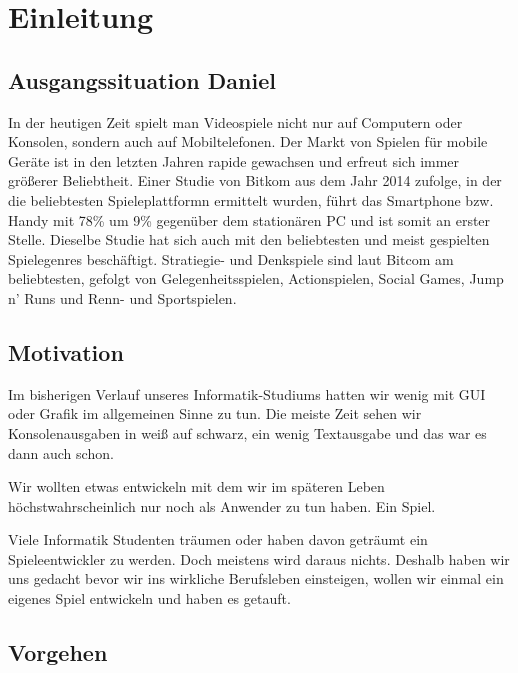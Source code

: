 \chapter{Einleitung}\label{ch:intro}

\section[Ausgangssituation]{Ausgangssituation \tiny{Daniel}}\label{sec:1_Ausgangssituation}

In der heutigen Zeit spielt man Videospiele nicht nur auf Computern oder Konsolen, sondern auch auf Mobiltelefonen. Der Markt von Spielen für mobile Geräte ist in den letzten Jahren rapide gewachsen und erfreut sich immer größerer Beliebtheit. Einer Studie von Bitkom \cite{bitkomgaming} aus dem Jahr 2014 zufolge, in der die beliebtesten Spieleplattformn ermittelt wurden, führt das Smartphone bzw. Handy mit 78\% um 9\% gegenüber dem stationären PC und ist somit an erster Stelle. Dieselbe Studie hat sich auch mit den beliebtesten und meist gespielten Spielegenres beschäftigt. Stratiegie- und Denkspiele sind laut Bitcom am beliebtesten, gefolgt von Gelegenheitsspielen, Actionspielen, Social Games, Jump n' Runs und Renn- und Sportspielen.




\section{Motivation}\label{sec:1_Motivation}

Im bisherigen Verlauf unseres Informatik-Studiums hatten wir wenig mit GUI oder Grafik im allgemeinen Sinne zu tun. Die meiste Zeit sehen wir Konsolenausgaben in weiß auf schwarz, ein wenig Textausgabe und das war es dann auch schon. 

Wir wollten etwas entwickeln mit dem wir im späteren Leben höchstwahrscheinlich nur noch als Anwender zu tun haben. Ein Spiel. 

Viele Informatik Studenten träumen oder haben davon geträumt ein Spieleentwickler zu werden. Doch meistens wird daraus nichts. Deshalb haben wir uns gedacht bevor wir ins wirkliche Berufsleben einsteigen, wollen wir einmal ein eigenes Spiel entwickeln und haben es \gamename getauft.



\section{Vorgehen}\label{sec:1_Vorgehen}

